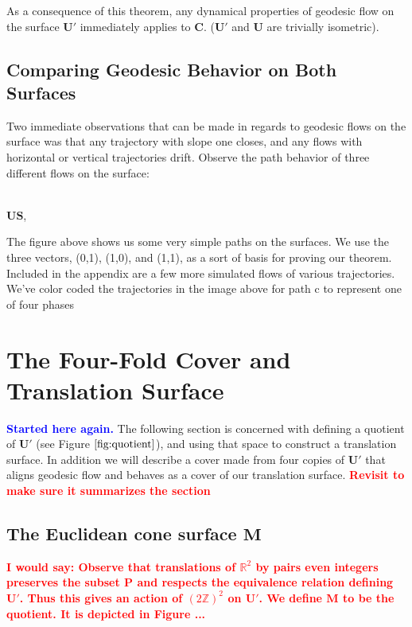 \documentclass[]{article}
\newcommand{\compav}[1]{\textbf{\textcolor{blue}{#1}}}
\newcommand{\compat}[1]{\textbf{\textcolor{red}{#1}}}
\begin{document}
As a consequence of this theorem, any dynamical properties of geodesic flow on the surface $\mathbf{U}'$ immediately applies to $\mathbf{C}$. ($\mathbf{U}'$ and $\mathbf{U}$ are trivially isometric).

\subsection{Comparing Geodesic Behavior on Both Surfaces}
Two immediate observations that can be made in regards to geodesic flows on the surface was that any trajectory with slope one closes, and any flows with horizontal or vertical trajectories drift. Observe the path behavior of three different flows on the surface:

\begin{center}
\hspace{0.1in}
\raisebox{0.5in}{}
\\ $\mathbf{U}$$\mathbf{S}$,
\\ 
\end{center}

The figure above shows us some very simple paths on the surfaces. We use the three vectors, (0,1), (1,0), and (1,1), as a sort of basis for proving our theorem. Included in the appendix are a few more simulated flows of various trajectories. We've color coded the trajectories in the image above for path c to represent one of four phases

\newpage
\section{The Four-Fold Cover and Translation Surface}
\compav{Started here again.}
The following section is concerned with defining a quotient of $\mathbf{U}'$ (see Figure $\ref{fig:quotient}$), and using that space to construct a translation surface. In addition we will describe a cover made from four copies of $\mathbf{U}'$ that aligns geodesic flow and behaves as a cover of our translation surface. \compat{Revisit to make sure it summarizes the section}

\subsection{The Euclidean cone surface $\mathbf{M}$}
\compat{I would say: Observe that translations of ${\mathbb R}^2$ by pairs even integers preserves the subset ${\mathbf P}$ and respects the equivalence relation defining ${\mathbf U'}$. Thus this gives an action of $(2{\mathbb Z})^2$ on ${\mathbf U}'$. We define ${\mathbf M}$ to be the quotient. It is depicted in Figure ...}
\end{document}
